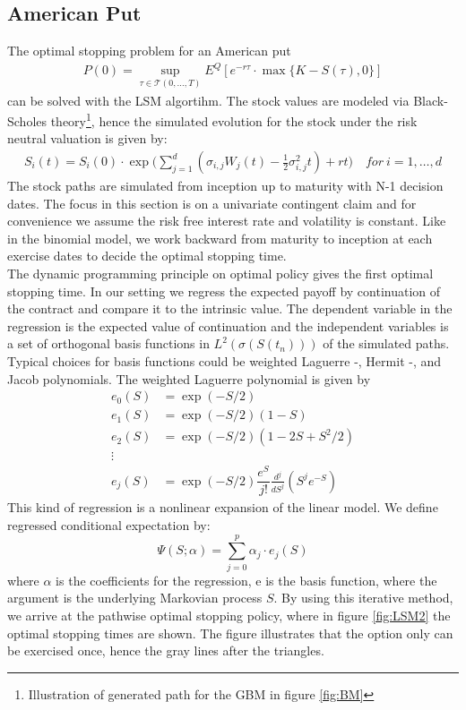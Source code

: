 \subsection{American Put}
The optimal stopping problem for an American put 
\begin{equation}\label{optimalStopPut}
\begin{split}
P(0) = \sup_{\tau \in \mathcal{T}(0,\ldots,T)} E^Q[ e^{-r \tau} \cdot \max\{K-S(\tau), 0 \}]
\end{split}
\end{equation}
can be solved with the LSM algortihm. The stock values are modeled via Black-Scholes theory\footnote{Illustration of generated path for the GBM in figure \ref{fig:BM}}, hence the simulated evolution for the stock under the risk neutral valuation is given by:
\begin{equation*}
\begin{split}
S_i(t)=S_i(0) \cdot \exp \bigg( \sum_{j=1}^{d}(\sigma_{i,j} W_j(t) -\frac{1}{2} \sigma_{i,j}^2 t) + rt \bigg) \quad  for \ i=1,\ldots,d
\end{split}
\end{equation*}
The stock paths are simulated from inception up to maturity with N-1 decision dates. The focus in this section is on a univariate contingent claim and for convenience we assume the risk free interest rate and volatility is constant. Like in the binomial model, we work backward from maturity to inception at each exercise dates to decide the optimal stopping time. \\

The dynamic programming principle on optimal policy gives the first optimal stopping time. In our setting we regress the expected payoff by continuation of the contract and compare it to the intrinsic value. The dependent variable in the regression is the expected value of continuation and the independent variables is a set of orthogonal basis functions in $L^2(\sigma(S(t_n)))$ of the simulated paths. Typical choices for basis functions could be weighted Laguerre -, Hermit -, and Jacob polynomials. The weighted Laguerre polynomial is given by
\begin{align*}
e_0(S) &= \exp(-S/2) \\
e_1(S) &= \exp(-S/2) (1-S) \\
e_2(S) &= \exp(-S/2) (1-2S+S^2/2) \\
\vdots \\
e_j(S) &= \exp(-S/2) \dfrac{e^S}{j!} \frac{d^j}{dS^j}(S^j e^{-S}) 
\end{align*} 
This kind of regression is a nonlinear expansion of the linear model. We define regressed conditional expectation by:
$$\Psi(S; \alpha)= \sum_{j=0}^p \alpha_j \cdot e_j(S) $$
where $\alpha$ is the coefficients for the regression, e is the basis function, where the argument is the underlying Markovian process $S$. By using this iterative method, we arrive at the pathwise optimal stopping policy, where in figure \ref{fig:LSM2} the optimal stopping times are shown. The figure illustrates that the option only can be exercised once, hence the gray lines after the triangles.

